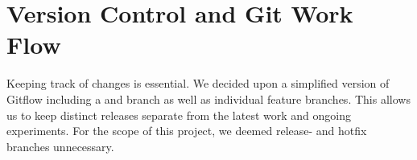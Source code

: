 \section{Version Control and Git Work Flow}
Keeping track of changes is essential. We decided upon a simplified version of Gitflow including a  and  branch as well as individual feature branches. This allows us to keep distinct releases separate from the latest work and ongoing experiments. For the scope of this project, we deemed release- and hotfix branches unnecessary.
